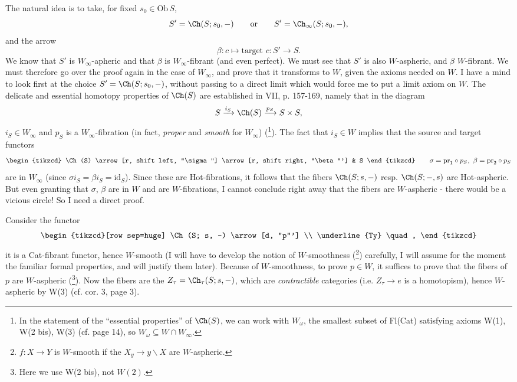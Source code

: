 The natural idea is to take, for fixed $s_0 \in \mathrm{Ob}\,S$,
\[ S' = \Ch(S; s_0, -) \qquad \text{or} \qquad S' = \Ch_\infty(S; s_0, -), \]
and the arrow
\[ \beta : c \longmapsto \text{target } c : S' \longrightarrow S. \]
We know that $S'$ is $W_\infty$-apheric and that $\beta$ is $W_\infty$-fibrant (and even perfect). We must see that $S'$ is also $W$-aspheric, and $\beta$ $W$-fibrant. We must therefore go over the proof again in the case of $W_\infty$, and prove that it transforms to $W$, %
given the axioms needed on $W$. I have a mind to look first at the choice $S' = \Ch(S; s_0, -)$, without passing to a direct limit which would force me to put a limit axiom on $W$. The delicate and essential homotopy properties of $\Ch(S)$ are established in VII, p. 157-169, namely that in the diagram
\[ S \xrightarrow{i_S} \Ch(S) \xrightarrow{p_S} S \times S, \]
$i_S \in W_\infty$ and $p_S$ is a $W_\infty$-fibration (in fact, \textit{proper} and \textit{smooth} for $W_\infty$) (\footnote[12]{In the statement of the ``essential properties'' of $\Ch(S)$, we can work with $W_\omega$, the smallest subset of Fl(Cat) satisfying axioms W(1), W(2 bis), W(3) (cf. page 14), so $W_\omega \subseteq W \cap W_\infty$.}). The fact that $i_S \in W$ implies that the source and target functors
\[ \begin{tikzcd} \Ch(S) \arrow[r, shift left, "\sigma"] \arrow[r, shift right, "\beta"'] & S \end{tikzcd} \qquad \sigma = \mathrm{pr}_1 \circ p_S,\ \beta = \mathrm{pr}_2 \circ p_S \]
are in $W_\infty$ (since $\sigma i_S = \beta i_S = \mathrm{id}_S$). Since these are Hot-fibrations, it follows that the fibers $\Ch(S; s, -)$ resp. $\Ch(S; -, s)$ are Hot-aspheric. But even granting that $\sigma$, $\beta$ are in $W$ and are $W$-fibrations, I cannot conclude right away that the fibers are $W$-aspheric - there would be a vicious circle! So I need a direct proof.

Consider the functor
\[
\begin{tikzcd}[row sep=huge]
\Ch(S; s, -) \arrow[d, "p"'] \\
\underline{Ty} \quad ,
\end{tikzcd}
\]
it is a Cat-fibrant functor, hence $W$-smooth (I will have to develop the notion of $W$-smoothness (\footnote[13]{$f : X \longrightarrow Y$ is $W$-smooth if the $X_y \longrightarrow y\backslash X$ are $W$-aspheric.}) carefully, I will assume for the moment the familiar formal properties, and will justify them later). Because of $W$-smoothness, to prove $p \in W$, it suffices to
prove that the fibers of $p$ are $W$-aspheric (\footnote[14]{Here we use W(2 bis), not $W(2)$.}). Now the fibers are the $Z_\tau = \Ch_\tau(S; s, -)$, which are \textit{contractible} categories (i.e. $Z_\tau \longrightarrow e$ is a homotopism), hence $W$-aspheric by W(3) (cf. cor. 3, page 3).

